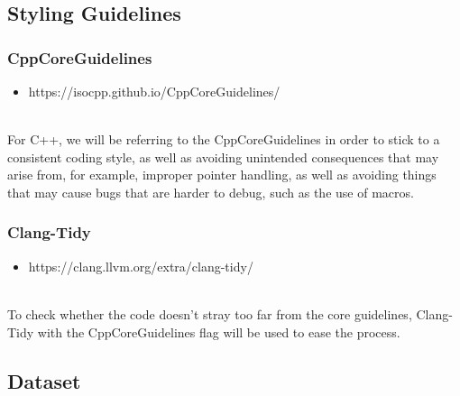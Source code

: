 \documentclass[conference]{IEEEtran}
\begin{document}
\subsection{Styling Guidelines}
\subsubsection{CppCoreGuidelines}
\begin{itemize}
\item https://isocpp.github.io/CppCoreGuidelines/
\end{itemize}~\\
For C++, we will be referring to the CppCoreGuidelines in order to stick to a consistent coding style, as well as avoiding unintended consequences that may arise from, for example, improper pointer handling, as well as avoiding things that may cause bugs that are harder to debug, such as the use of macros.
\newline
\subsubsection{Clang-Tidy}
\begin{itemize}
\item https://clang.llvm.org/extra/clang-tidy/
\end{itemize}~\\
To check whether the code doesn't stray too far from the core guidelines, Clang-Tidy with the CppCoreGuidelines flag will be used to ease the process.~\\

\subsection{Dataset}
\end{document}
